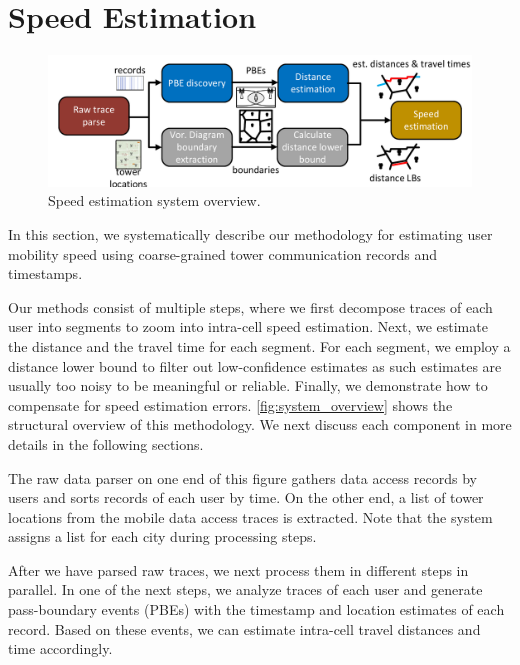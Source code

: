 \section{Speed Estimation}\label{approach}

\begin{figure}
    \centering
    \includegraphics[width=\linewidth]{./figures/system_overview.pdf}
    \vspace{-0.2in}
    \caption{Speed estimation system overview.}
    \label{fig:system_overview}
    \vspace{-0.1in}
\end{figure}

In this section, we systematically describe our methodology for estimating user mobility speed using coarse-grained tower communication records and timestamps.


Our methods consist of multiple steps, where we first decompose traces of each user into segments to zoom into intra-cell speed estimation. Next, we estimate the distance and the travel time for each segment. For each segment, we employ a distance lower bound to filter out low-confidence estimates as such estimates are usually too noisy to be meaningful or reliable. Finally, we demonstrate how to compensate for speed estimation errors. 
\autoref{fig:system_overview} shows the structural overview of this methodology. We next discuss each component in more details in the following sections.

The raw data parser on one end of this figure gathers data access records by users and sorts records of each user by time. On the other end, a list of tower locations from the mobile data access traces is extracted. Note that the system assigns a list for each city during processing steps.

After we have parsed raw traces, we next process them in different steps in parallel. In one of the next steps, we analyze traces of each user and generate pass-boundary events (PBEs) with the timestamp and location estimates of each record. Based on these events, we can estimate intra-cell travel distances and time accordingly.


